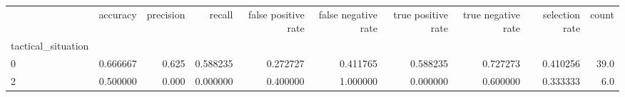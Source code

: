 \begin{tabular}{lrrrrrrrrr}
\toprule
{} &  accuracy &  precision &    recall &  false positive rate &  false negative rate &  true positive rate &  true negative rate &  selection rate &  count \\
tactical\_situation &           &            &           &                      &                      &                     &                     &                 &        \\
\midrule
0                  &  0.666667 &      0.625 &  0.588235 &             0.272727 &             0.411765 &            0.588235 &            0.727273 &        0.410256 &   39.0 \\
2                  &  0.500000 &      0.000 &  0.000000 &             0.400000 &             1.000000 &            0.000000 &            0.600000 &        0.333333 &    6.0 \\
\bottomrule
\end{tabular}
